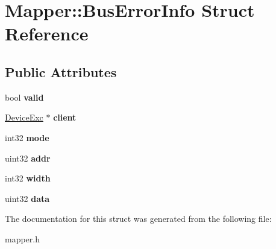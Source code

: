 \hypertarget{structMapper_1_1BusErrorInfo}{
\section{Mapper::BusErrorInfo Struct Reference}
\label{structMapper_1_1BusErrorInfo}
}
\subsection*{Public Attributes}
\begin{DoxyCompactItemize}
\item 
\hypertarget{structMapper_1_1BusErrorInfo_a2189a5bb3f0e212b8af9b1827fd79438}{
bool {\bfseries valid}}
\label{structMapper_1_1BusErrorInfo_a2189a5bb3f0e212b8af9b1827fd79438}

\item 
\hypertarget{structMapper_1_1BusErrorInfo_a3d02309c2a9729af3269ebdbc9880569}{
\hyperlink{classDeviceExc}{DeviceExc} $\ast$ {\bfseries client}}
\label{structMapper_1_1BusErrorInfo_a3d02309c2a9729af3269ebdbc9880569}

\item 
\hypertarget{structMapper_1_1BusErrorInfo_a079f278cef392e958aa1b326865379e1}{
int32 {\bfseries mode}}
\label{structMapper_1_1BusErrorInfo_a079f278cef392e958aa1b326865379e1}

\item 
\hypertarget{structMapper_1_1BusErrorInfo_a88774a55c1d2011647343a75fcf20dab}{
uint32 {\bfseries addr}}
\label{structMapper_1_1BusErrorInfo_a88774a55c1d2011647343a75fcf20dab}

\item 
\hypertarget{structMapper_1_1BusErrorInfo_a57a92fa076d8cd6c9b02cc77c8f42a90}{
int32 {\bfseries width}}
\label{structMapper_1_1BusErrorInfo_a57a92fa076d8cd6c9b02cc77c8f42a90}

\item 
\hypertarget{structMapper_1_1BusErrorInfo_ac77cb1e7a02ac4e15159fe03cc5aef27}{
uint32 {\bfseries data}}
\label{structMapper_1_1BusErrorInfo_ac77cb1e7a02ac4e15159fe03cc5aef27}

\end{DoxyCompactItemize}


The documentation for this struct was generated from the following file:\begin{DoxyCompactItemize}
\item 
mapper.h\end{DoxyCompactItemize}
